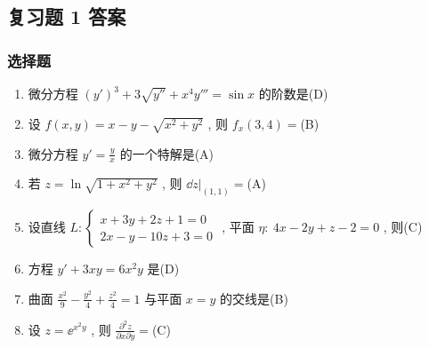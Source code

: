 \subsection{复习题 1 答案}
\subsubsection{选择题}
\begin{enumerate}
	\item 微分方程 $(y')^3+3\sqrt{y''}+x^4y'''=\sin x$ 的阶数是(\hspace{0.25pc}D\hspace{0.25pc})
	\item 设 $f(x,y)=x-y-\sqrt{x^2+y^2}$ , 则 $f_{x}(3,4)=$(\hspace{0.25pc}B\hspace{0.25pc})
	\item 微分方程 $y'=\frac{y}{x}$ 的一个特解是(\hspace{0.25pc}A\hspace{0.25pc})
	\item 若 $z=\ln\sqrt{1+x^2+y^2}$ , 则 $\left.\dd z\right|_{(1,1)}=$(\hspace{0.25pc}A\hspace{0.25pc})
	\item 设直线 $L:\begin{cases}
	x+3y+2z+1=0\\
	2x-y-10z+3=0
	\end{cases}$ , 平面 $\eta:\ 4x-2y+z-2=0$ , 则(\hspace{0.25pc}C\hspace{0.25pc})
	\item 方程 $y'+3xy=6x^2y$ 是(\hspace{0.25pc}D\hspace{0.25pc})
	\item 曲面 $\frac{x^2}{9}-\frac{y^2}{4}+\frac{z^2}{4}=1$ 与平面 $x=y$ 的交线是(\hspace{0.25pc}B\hspace{0.25pc})
	\item 设 $z=\ee^{x^2y}$ , 则 $\frac{\partial^2z}{\partial x\partial y}=$(\hspace{0.25pc}C\hspace{0.25pc})

\end{enumerate}
